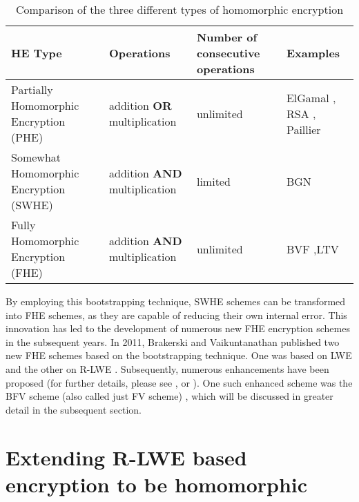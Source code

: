 \begin{table}
  \caption{Comparison of the three different types of homomorphic encryption}
  \label{table:HeTypeComparison}
  \begin{tabular}{|p{5cm}|p{2.8cm}|p{2.1cm}|p{3cm}|}
    \toprule
    HE Type                                         & Operations                           & Number of consecutive operations & Examples                                                                           \\
    \midrule
    Partially Homomorphic \newline Encryption (PHE) & addition \textbf{OR} multiplication  & unlimited                        & ElGamal \cite{ElGamal}, \newline RSA \cite{RSA}, \newline Paillier \cite{Paillier} \\
    \midrule
    Somewhat Homomorphic \newline Encryption (SWHE) & addition \textbf{AND} multiplication & limited                          & BGN \cite{BGN}                                                                     \\
    \midrule
    Fully Homomorphic \newline Encryption (FHE)     & addition \textbf{AND} multiplication & unlimited                        & BVF \cite{bfv},\newline LTV \cite{LTV}                                             \\
    \bottomrule
  \end{tabular}
\end{table}

By employing this bootstrapping technique, SWHE schemes can be transformed into FHE schemes, as they are capable of reducing their own internal error. This innovation has led to the development of numerous new FHE encryption schemes in the subsequent years. In 2011, Brakerski and Vaikuntanathan published two new FHE schemes based on the bootstrapping technique. One was based on LWE \cite{FirstLweFHE} and the other on R-LWE \cite{FirstRLweFHE}. Subsequently, numerous enhancements have been proposed (for further details, please see \cite{SurveyOfHomomorphicEncryption}, \cite{FheImplementations} or \cite{FHESurvey}). One such enhanced scheme was the BFV scheme (also called just FV scheme) \cite{bfv}, which will be discussed in greater detail in the subsequent section.


\section{Extending R-LWE based encryption to be homomorphic}

